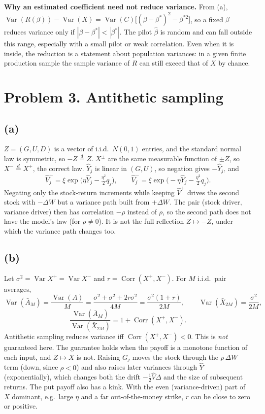 \documentclass[10pt]{article}
\newcommand{\Var}{\operatorname{Var}}
\newcommand{\Corr}{\operatorname{Corr}}
\newcommand{\Yh}{\widehat Y}
\newcommand{\Vh}{\widehat V}
\begin{document}
\textbf{Why an estimated coefficient need not reduce variance.} From (a),
$\Var(R(\beta))-\Var(X)=\Var(C)\big[(\beta-\beta^*)^2-\beta^{*2}\big]$, so a fixed $\beta$ reduces
variance only if $|\beta-\beta^*|<|\beta^*|$. The pilot $\hat\beta$ is random and can fall outside
this range, especially with a small pilot or weak correlation. Even when it is inside, the
reduction is a statement about population variances: in a given finite production sample the
sample variance of $R$ can still exceed that of $X$ by chance.

\section*{Problem 3. Antithetic sampling}

\subsection*{(a)}
$Z=(G,U,D)$ is a vector of i.i.d.\ $N(0,1)$ entries, and the standard normal law is symmetric,
so $-Z\overset{d}{=}Z$. $X^\pm$ are the same measurable function of $\pm Z$, so
$X^-\overset{d}{=}X^+$, the correct law. $\Yh_j$ is linear in $(G,U)$, so negation gives $-\Yh_j$, and
\[
\Vh_j^+=\xi\exp\!\big(\eta\Yh_j-\tfrac{\eta^2}{2}q_j\big),\qquad
\Vh_j^-=\xi\exp\!\big(-\eta\Yh_j-\tfrac{\eta^2}{2}q_j\big).
\]
Negating only the stock-return increments while keeping $\Vh^+$ drives the second stock with
$-\Delta W$ but a variance path built from $+\Delta W$. The pair (stock driver, variance driver) then
has correlation $-\rho$ instead of $\rho$, so the second path does not have the model's law (for
$\rho\neq0$). It is not the full reflection $Z\mapsto-Z$, under which the variance path changes too.

\subsection*{(b)}
Let $\sigma^2=\Var X^+=\Var X^-$ and $r=\Corr(X^+,X^-)$. For $M$ i.i.d.\ pair averages,
\[
\Var(\bar A_M)=\frac{\Var(A)}{M}=\frac{\sigma^2+\sigma^2+2r\sigma^2}{4M}=\frac{\sigma^2(1+r)}{2M},
\qquad \Var(\bar X_{2M})=\frac{\sigma^2}{2M},
\]
\[
\frac{\Var(\bar A_M)}{\Var(\bar X_{2M})}=1+\Corr(X^+,X^-).
\]
Antithetic sampling reduces variance iff $\Corr(X^+,X^-)<0$. This is \emph{not} guaranteed here. The
guarantee holds when the payoff is a monotone function of each input, and $Z\mapsto X$ is not. Raising
$G_j$ moves the stock through the $\rho\,\Delta W$ term (down, since $\rho<0$) and also raises
later variances through $\Yh$ (exponentially), which changes both the drift $-\frac12\Vh\Delta$ and the
size of subsequent returns. The put payoff also has a kink. With the even (variance-driven) part of
$X$ dominant, e.g.\ large $\eta$ and a far out-of-the-money strike, $r$ can be close to zero or positive.
\end{document}
